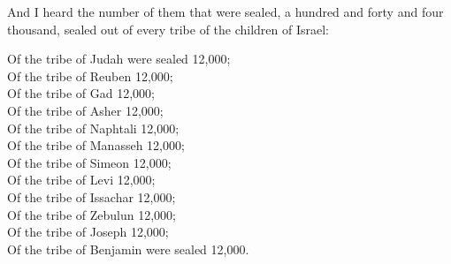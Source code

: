 And I heard the number of them that were sealed, a hundred and forty and four thousand, sealed out of every tribe of the children of Israel:%
\newpage
\begin{flushleft}
Of the tribe of Judah were sealed 12,000; \\
Of the tribe of Reuben 12,000; \\
Of the tribe of Gad 12,000; \\
Of the tribe of Asher 12,000; \\
Of the tribe of Naphtali 12,000; \\
Of the tribe of Manasseh 12,000; \\
Of the tribe of Simeon 12,000; \\
Of the tribe of Levi 12,000; \\
Of the tribe of Issachar 12,000;\\
Of the tribe of Zebulun 12,000; \\
Of the tribe of Joseph 12,000; \\
Of the tribe of Benjamin were sealed 12,000.
\end{flushleft}

